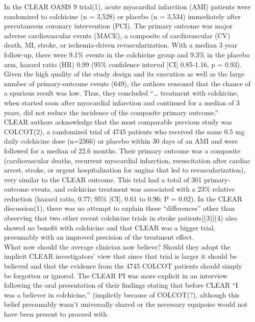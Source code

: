 \documentclass[
  letterpaper,
  DIV=11,
  numbers=noendperiod]{scrartcl}
\begin{document}
In the CLEAR OASIS 9 trial(1), acute myocardial infarction (AMI)
patients were randomized to colchicine (n = 3,528) or placebo (n =
3,534) immediately after percutaneous coronary intervention (PCI). The
primary outcome was major adverse cardiovascular events (MACE), a
composite of cardiovascular (CV) death, MI, stroke, or ischemia-driven
revascularization. With a median 3 year follow-up, there were 9.1\%
events in the colchicine group and 9.3\% in the placebo arm, hazard
ratio (HR) 0.99 (95\% confidence interval {[}CI{]} 0.85-1.16, p = 0.93).
Given the high quality of the study design and its execution as well as
the large number of primary-outcome events (649), the authors reasoned
that the chance of a spurious result was low. Thus, they concluded
``\ldots{} treatment with colchicine, when started soon after myocardial
infarction and continued for a median of 3 years, did not reduce the
incidence of the composite primary outcome.''\\
CLEAR authors acknowledge that the most comparable previous study was
COLCOT(2), a randomized trial of 4745 patients who received the same 0.5
mg daily colchicine dose (n=2366) or placebo within 30 days of an AMI
and were followed for a median of 22.6 months. Their primary outcome was
a composite (cardiovascular deaths, recurrent myocardial infarction,
resuscitation after cardiac arrest, stroke, or urgent hospitalization
for angina that led to revascularization), very similar to the CLEAR
outcome. This trial had a total of 301 primary-outcome events, and
colchicine treatment was associated with a 23\% relative reduction
(hazard ratio, 0.77; 95\% {[}CI{]}, 0.61 to 0.96; P = 0.02). In the
CLEAR discussion(1), there was no attempt to explain these
``differences'' other than observing that two other recent colchicine
trials in stroke patients{[}(3){]}(4) also showed no benefit with
colchicine and that CLEAR was a bigger trial, presumably with an
improved precision of the treatment effect.\\
What now should the average clinician now believe? Should they adopt the
implicit CLEAR investigators' view that since that trial is larger it
should be believed and that the evidence from the 4745 COLCOT patients
should simply be forgotten or ignored. The CLEAR PI was more explicit in
an interview following the oral presentation of their findings stating
that before CLEAR ``I was a believer in colchicine,'' (implictly because
of COLCOT(?), although this belief presumably wasn't universally shared
or the necessary equipoise would not have been present to proceed with
\end{document}
